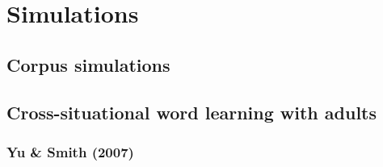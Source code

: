 \documentclass[man,noapacite,12pt]{apa2}
\newcommand{\vect}[1]{\accentset{\rightharpoonup}{#1}}
\begin{document}
 




%
%
%
%
%
%

\section{Simulations}

\subsection{Corpus simulations}



\subsection{Cross-situational word learning with adults}

\subsubsection{Yu \& Smith (2007)}
\end{document}
